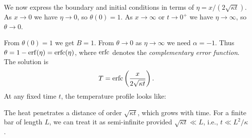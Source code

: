 \documentclass[a4paper]{article}
\begin{document}
\begin{eg}
  We now express the boundary and initial conditions in terms of $\eta = x/(2\sqrt{\kappa t})$. As $x \to 0$ we have $\eta \to 0$, so $\theta(0) = 1$. As $x\to \infty$ or $t\to 0^+$ we have $\eta \to \infty$, so $\theta \to 0$.

  From $\theta(0) = 1$ we get $B = 1$. From $\theta \to 0$ as $\eta \to \infty$ we need $\alpha = -1$. Thus $\theta = 1 - \operatorname{erf}(\eta) = \operatorname{erfc}(\eta)$, where $\operatorname{erfc}$ denotes the \emph{complementary error function}. The solution is
  \[
    T = \operatorname{erfc}\left(\frac{x}{2\sqrt{\kappa t}}\right).
  \]
  At any fixed time $t$, the temperature profile looks like:
  \begin{center}
  \end{center}
  The heat penetrates a distance of order $\sqrt{\kappa t}$, which grows with time. For a finite bar of length $L$, we can treat it as semi-infinite provided $\sqrt{\kappa t} \ll L$, i.e., $t \ll L^2/\kappa$.
\end{eg}
\end{document}
